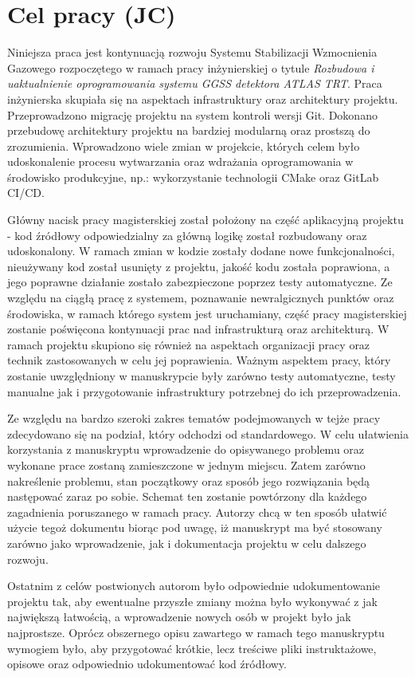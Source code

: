 \section{Cel pracy (JC)}


Niniejsza praca jest kontynuacją rozwoju Systemu Stabilizacji Wzmocnienia Gazowego rozpoczętego w ramach pracy
inżynierskiej o tytule \emph{Rozbudowa i uaktualnienie oprogramowania systemu GGSS detektora ATLAS TRT}. Praca inżynierska skupiała się na aspektach infrastruktury oraz architektury projektu. Przeprowadzono migrację projektu na system kontroli wersji Git. Dokonano przebudowę architektury projektu na bardziej modularną oraz prostszą do zrozumienia. Wprowadzono wiele zmian w projekcie, których celem było udoskonalenie procesu wytwarzania oraz wdrażania oprogramowania w środowisko produkcyjne, np.: wykorzystanie technologii CMake oraz GitLab CI/CD.


Główny nacisk pracy magisterskiej został położony na część aplikacyjną projektu - kod źródłowy odpowiedzialny za
główną logikę został rozbudowany oraz udoskonalony. W ramach zmian w kodzie zostały dodane nowe funkcjonalności,
nieużywany kod został usunięty z projektu, jakość kodu została poprawiona, a jego poprawne działanie zostało
zabezpieczone poprzez testy automatyczne. Ze względu na ciągłą pracę z systemem, poznawanie newralgicznych punktów oraz środowiska, w ramach którego system jest uruchamiany, część pracy magisterskiej zostanie poświęcona kontynuacji prac nad infrastrukturą oraz architekturą. W ramach projektu skupiono się również na aspektach organizacji pracy oraz technik zastosowanych w celu jej poprawienia. Ważnym aspektem pracy, który zostanie uwzględniony w manuskrypcie były zarówno testy automatyczne, testy manualne jak i przygotowanie infrastruktury potrzebnej do ich przeprowadzenia.


Ze względu na bardzo szeroki zakres tematów podejmowanych w tejże pracy zdecydowano się na podział, który odchodzi od standardowego. W celu ułatwienia korzystania z manuskryptu wprowadzenie do opisywanego problemu oraz wykonane prace zostaną zamieszczone w jednym miejscu. Zatem zarówno nakreślenie problemu, stan początkowy oraz sposób jego rozwiązania będą następować zaraz po sobie. Schemat ten zostanie powtórzony dla każdego zagadnienia poruszanego w ramach pracy. Autorzy chcą w ten sposób ułatwić użycie tegoż dokumentu biorąc pod uwagę, iż manuskrypt ma być stosowany zarówno jako wprowadzenie, jak i dokumentacja projektu w celu dalszego rozwoju.


Ostatnim z celów postwionych autorom było odpowiednie udokumentowanie projektu tak, aby ewentualne przyszłe zmiany można było wykonywać z jak największą łatwością, a wprowadzenie nowych osób w projekt było jak najprostsze. Oprócz obszernego opisu zawartego w ramach tego manuskryptu wymogiem było, aby przygotować krótkie, lecz treściwe pliki instruktażowe, opisowe oraz odpowiednio udokumentować kod źródłowy.